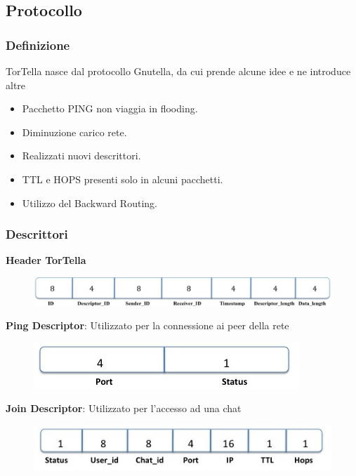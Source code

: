 \documentclass[a4paper,italian,12pt]{beamer}
\begin{document}
    	\subsection{Protocollo}
    		\begin{frame}
    			\frametitle{Definizione}
   				\begin{beamerboxesrounded}[upper=palette primary,lower=palette primary,shadow=true]{ }
    				TorTella nasce dal protocollo Gnutella, da cui prende alcune idee e ne introduce altre
    			\end{beamerboxesrounded}
				\vspace{10mm}
    			\begin{itemize}
    				\item Pacchetto PING non viaggia in flooding.
    				\item Diminuzione carico rete.
    				\item Realizzati nuovi descrittori.
    				\item TTL e HOPS presenti solo in alcuni pacchetti.
    				\item Utilizzo del Backward Routing.
    			\end{itemize}
    		\end{frame}
    		\begin{frame}
    			\frametitle{Descrittori}	
	    			\textbf{Header TorTella}
    				\begin{figure}[H]
						\includegraphics[scale=0.15]{etc/tortellaheader.jpg}
					\end{figure}
					\textbf{Ping Descriptor}: Utilizzato per la connessione ai peer della rete
    				\begin{figure}[H]
						\includegraphics[scale=0.3]{etc/ping.jpg}
					\end{figure}
					\textbf{Join Descriptor}: Utilizzato per l'accesso ad una chat
    				\begin{figure}[H]
						\includegraphics[scale=0.3]{etc/join.jpg}
					\end{figure}
    		\end{frame}
\end{document}
